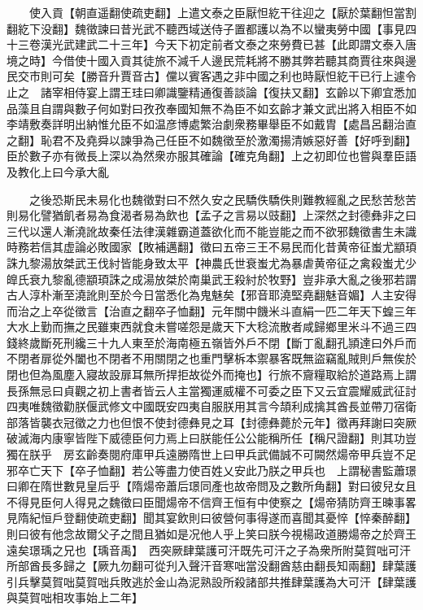 　　使入貢【朝直遥翻使疏吏翻】上遣文泰之臣厭怛紇干往迎之【厭於葉翻怛當割翻紇下没翻】魏徵諫曰昔光武不聽西域送侍子置都護以為不以蠻夷勞中國【事見四十三卷漢光武建武二十三年】今天下初定前者文泰之來勞費已甚【此即謂文泰入唐境之時】今借使十國入貢其徒旅不減千人邊民荒耗將不勝其弊若聽其商賈往來與邊民交市則可矣【勝音升賈音古】儻以賓客遇之非中國之利也時厭怛紇干已行上遽令止之　諸宰相侍宴上謂王珪曰卿識鑒精通復善談論【復扶又翻】玄齡以下卿宜悉加品藻且自謂與數子何如對曰孜孜奉國知無不為臣不如玄齡才兼文武出將入相臣不如李靖敷奏詳明出納惟允臣不如温彦博處繁治劇衆務畢舉臣不如戴胄【處昌呂翻治直之翻】恥君不及堯舜以諫爭為己任臣不如魏徵至於激濁揚清嫉惡好善【好呼到翻】臣於數子亦有微長上深以為然衆亦服其確論【確克角翻】上之初即位也嘗與羣臣語及教化上曰今承大亂

　　之後恐斯民未易化也魏徵對曰不然久安之民驕佚驕佚則難教經亂之民愁苦愁苦則易化譬猶飢者易為食渴者易為飲也【孟子之言易以豉翻】上深然之封德彝非之曰三代以還人漸澆訛故秦任法律漢雜霸道蓋欲化而不能豈能之而不欲邪魏徵書生未識時務若信其虚論必敗國家【敗補邁翻】徵曰五帝三王不易民而化昔黄帝征蚩尤顓頊誅九黎湯放桀武王伐紂皆能身致太平【神農氏世衰蚩尤為暴虐黄帝征之禽殺蚩尤少皥氏衰九黎亂德顓頊誅之成湯放桀於南巢武王殺紂於牧野】豈非承大亂之後邪若謂古人淳朴漸至澆訛則至於今日當悉化為鬼魅矣【邪音耶澆堅堯翻魅音媚】人主安得而治之上卒從徵言【治直之翻卒子恤翻】元年關中饑米斗直絹一匹二年天下蝗三年大水上勤而撫之民雖東西就食未嘗嗟怨是歲天下大稔流散者咸歸鄉里米斗不過三四錢終歲斷死刑纔三十九人東至於海南極五嶺皆外戶不閉【斷丁亂翻孔頴達曰外戶而不閉者扉從外闔也不閉者不用關閉之也重門擊柝本禦暴客既無盜竊亂賊則戶無俟於閉也但為風塵入寢故設扉耳無所捍拒故從外而掩也】行旅不齎糧取給於道路焉上謂長孫無忌曰貞觀之初上書者皆云人主當獨運威權不可委之臣下又云宜震耀威武征討四夷唯魏徵勸朕偃武修文中國既安四夷自服朕用其言今頡利成擒其酋長並帶刀宿衛部落皆襲衣冠徵之力也但恨不使封德彝見之耳【封德彝薨於元年】徵再拜謝曰突厥破滅海内康寧皆陛下威德臣何力焉上曰朕能任公公能稱所任【稱尺證翻】則其功豈獨在朕乎　房玄齡奏閱府庫甲兵遠勝隋世上曰甲兵武備誠不可闕然煬帝甲兵豈不足邪卒亡天下【卒子恤翻】若公等盡力使百姓乂安此乃朕之甲兵也　上謂秘書監蕭璟曰卿在隋世數見皇后乎【隋煬帝蕭后璟同產也故帝問及之數所角翻】對曰彼兒女且不得見臣何人得見之魏徵曰臣聞煬帝不信齊王恒有中使察之【煬帝猜防齊王暕事畧見隋紀恒戶登翻使疏吏翻】聞其宴飲則曰彼營何事得遂而喜聞其憂悴【悴秦醉翻】則曰彼有他念故爾父子之間且猶如是况他人乎上笑曰朕今視楊政道勝煬帝之於齊王遠矣璟瑀之兄也【瑀音禹】　西突厥肆葉護可汗既先可汗之子為衆所附莫賀咄可汗所部酋長多歸之【厥九勿翻可從刋入聲汗音寒咄當没翻酋慈由翻長知兩翻】肆葉護引兵擊莫賀咄莫賀咄兵敗逃於金山為泥熟設所殺諸部共推肆葉護為大可汗【肆葉護與莫賀咄相攻事始上二年】


